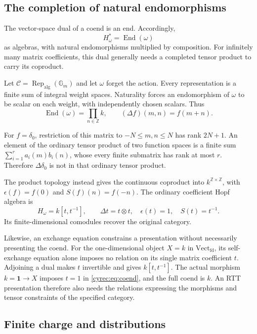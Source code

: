 \subsection{The completion of natural endomorphisms}

The vector-space dual of a coend is an end. Accordingly,
\[
 H_\omega^*=\operatorname{End}(\omega)
\]
as algebras, with natural endomorphisms multiplied by composition.
For infinitely many matrix coefficients, this dual generally needs
a completed tensor product to carry its coproduct.

\begin{example}\label{cyrec:ex:torus}
Let $\mathcal C=\operatorname{Rep}_{\mathrm{alg}}(\mathbb G_m)$
and let $\omega$ forget the action. Every representation is a finite
sum of integral weight spaces. Naturality forces an endomorphism
of $\omega$ to be scalar on each weight, with independently chosen
scalars. Thus
\[
 \operatorname{End}(\omega)=\prod_{n\in\mathbb Z}k,
 \qquad (\Delta f)(m,n)=f(m+n).
\]

For $f=\delta_0$, restriction of this matrix to
$-N\leq m,n\leq N$ has rank $2N+1$.
An element of the ordinary tensor product of two function spaces
is a finite sum $\sum_{i=1}^r a_i(m)b_i(n)$, whose every finite
submatrix has rank at most $r$. Therefore $\Delta\delta_0$ is not
in that ordinary tensor product.

The product topology instead gives the continuous coproduct into
$k^{\mathbb Z\times\mathbb Z}$, with
$\epsilon(f)=f(0)$ and $S(f)(n)=f(-n)$.
The ordinary coefficient Hopf algebra is
\[
 H_\omega=k[t,t^{-1}],\qquad
 \Delta t=t\otimes t,\quad\epsilon(t)=1,\quad S(t)=t^{-1}.
\]
Its finite-dimensional comodules recover the original category.
\end{example}

Likewise, an exchange equation constrains a presentation without
necessarily presenting the coend. For the one-dimensional object
$X=k$ in $\mathrm{Vect}_{\mathrm{fd}}$, its self-exchange equation
alone imposes no relation on its single matrix coefficient $t$.
Adjoining a dual makes $t$ invertible and gives $k[t,t^{-1}]$.
The actual morphism $k=\mathbf1\to X$ imposes $t=1$ in
\eqref{cyrec:eq:coend}, and the full coend is $k$.
An RTT presentation therefore also needs the relations expressing
the morphisms and tensor constraints of the specified category.

\subsection{Finite charge and distributions}

